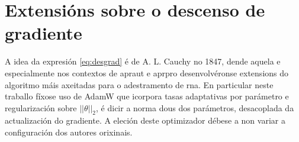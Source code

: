 \section{Extensións sobre o descenso de gradiente}

A idea da expresión \eqref{eq:desgrad} é de A. L. Cauchy no 1847, dende aquela e especialmente nos contextos de \acrshort{apraut} e \acrshort{aprpro} desenvolvéronse extensions do algoritmo máis axeitadas para o adestramento de \acrshort{rna}. En particular neste traballo fíxose uso de AdamW \cite{adamw} que icorpora tasas adaptativas por parámetro e regularización sobre $||\theta||_2$, é dicir a norma dous dos parámetros, desacoplada da actualización do gradiente. A eleción deste optimizador débese a non variar a configuración dos autores orixinais.
